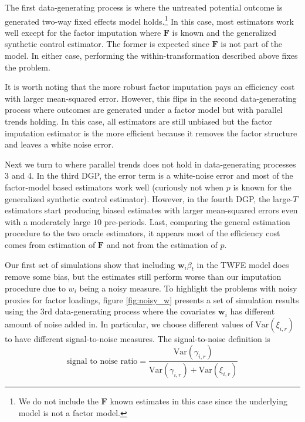 \documentclass[12pt]{article}
\begin{document}
The first data-generating process is where the untreated potential outcome is generated two-way fixed effects model holds.\footnote{We do not include the $\bm{F}$ known estimates in this case since the underlying model is not a factor model.} In this case, most estimators work well except for the factor imputation where $\bm{F}$ is known and the generalized synthetic control estimator. The former is expected since $\bm{F}$ is not part of the model. In either case, performing the within-transformation described above fixes the problem. 

It is worth noting that the more robust factor imputation pays an efficiency cost with larger mean-squared error. However, this flips in the second data-generating process where outcomes are generated under a factor model but with parallel trends holding. In this case, all estimators are still unbiased but the factor imputation estimator is the more efficient because it removes the factor structure and leaves a white noise error.

Next we turn to where parallel trends does not hold in data-generating processes 3 and 4. In the third DGP, the error term is a white-noise error and most of the factor-model based estimators work well (curiously not when $p$ is known for the generalized synthetic control estimator). However, in the fourth DGP, the large-$T$ estimators start producing biased estimates with larger mean-squared errors even with a moderately large $10$ pre-periods. Last, comparing the general estimation procedure to the two oracle estimators, it appears most of the efficiency cost comes from estimation of $\bm{F}$ and not from the estimation of $p$.

Our first set of simulations show that including $\bm{w}_i \beta_t$ in the TWFE model does remove some bias, but the estimates still perform worse than our imputation procedure due to $w_i$ being a noisy measure. To highlight the problems with noisy proxies for factor loadings, figure \ref{fig:noisy_w} presents a set of simulation results using the 3rd data-generating process where the covariates $\bm{w}_i$ has different amount of noise added in. In particular, we choose different values of $\text{Var}(\xi_{i,r})$ to have different signal-to-noise measures. The signal-to-noise definition is 
\begin{equation}
    \text{signal to noise ratio} = \frac{\text{Var}(\gamma_{i,r})}{\text{Var}(\gamma_{i,r}) + \text{Var}(\xi_{i,r})}
\end{equation}
\end{document}
